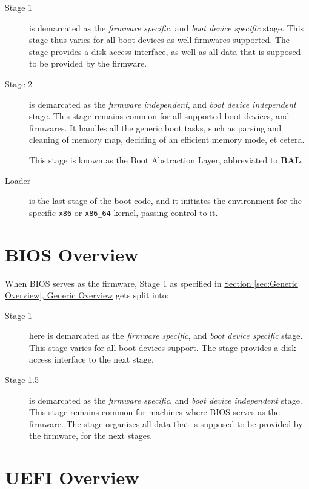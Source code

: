 \documentclass[a4paper,oneside]{memoir}
\begin{document}
\begin{description}
    \item[Stage 1] is demarcated as the \emph{firmware specific}, and \emph{boot device specific} stage. This stage thus varies for all boot devices as well firmwares supported. The stage provides a disk access interface, as well as all data that is supposed to be provided by the firmware.

    \item[Stage 2] is demarcated as the \emph{firmware independent}, and \emph{boot device independent} stage. This stage remains common for all supported boot devices, and firmwares. It handles all the generic boot tasks, such as parsing and cleaning of memory map, deciding of an efficient memory mode, et cetera. 

    This stage is known as the Boot Abstraction Layer, abbreviated to \textbf{BAL}.

    \item[Loader] is the last stage of the boot-code, and it initiates the environment for the specific \texttt{x86} or \texttt{x86\_64} kernel, passing control to it.
\end{description}

\section{BIOS Overview}

When BIOS serves as the firmware, Stage 1 as specified in \hyperref[sec:Generic Overview]{Section \ref*{sec:Generic Overview}, Generic Overview} gets split into:

\begin{description}
    \item[Stage 1] here is demarcated as the \emph{firmware specific}, and \emph{boot device specific} stage. This stage varies for all boot devices support. The stage provides a disk access interface to the next stage.

    \item[Stage 1.5]  is demarcated as the \emph{firmware specific}, and \emph{boot device independent} stage. This stage remains common for machines where BIOS serves as the firmware. The stage organizes all data that is supposed to be provided by the firmware, for the next stages.
\end{description}

\section{UEFI Overview}
\end{document}
